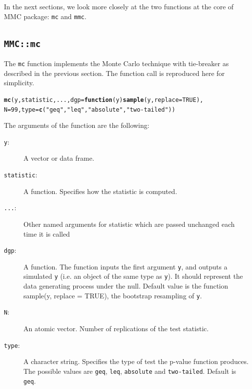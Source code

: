 \documentclass[]{article}\usepackage[]{graphicx}\usepackage[]{color}
\makeatletter
\newcommand{\hlnum}[1]{\textcolor[rgb]{0.686,0.059,0.569}{#1}}%
\newcommand{\hlstr}[1]{\textcolor[rgb]{0.192,0.494,0.8}{#1}}%
\newcommand{\hlstd}[1]{\textcolor[rgb]{0.345,0.345,0.345}{#1}}%
\newcommand{\hlkwa}[1]{\textcolor[rgb]{0.161,0.373,0.58}{\textbf{#1}}}%
\newcommand{\hlkwc}[1]{\textcolor[rgb]{0.333,0.667,0.333}{#1}}%
\newcommand{\hlkwd}[1]{\textcolor[rgb]{0.737,0.353,0.396}{\textbf{#1}}}%
\newenvironment{kframe}{%
 \def\at@end@of@kframe{}%
 \ifinner\ifhmode%
  \def\at@end@of@kframe{\end{minipage}}%
  \begin{minipage}{\columnwidth}%
 \fi\fi%
 \def\FrameCommand##1{\hskip\@totalleftmargin \hskip-\fboxsep
 \colorbox{shadecolor}{##1}\hskip-\fboxsep
     \hskip-\linewidth \hskip-\@totalleftmargin \hskip\columnwidth}%
 \MakeFramed {\advance\hsize-\width
   \@totalleftmargin\z@ \linewidth\hsize
   \@setminipage}}%
 {\par\unskip\endMakeFramed%
 \at@end@of@kframe}
\newenvironment{knitrout}{}{} %
\newcommand{\pkg}[1]{{\normalfont\fontseries{b}\selectfont #1}}
\let\code=\texttt
\makeatother
\begin{document}
In the next sections, we look more closely at the two functions at the core of \pkg{MMC} package: \code{mc} and \code{mmc}.

\subsection{\code{MMC::mc}}

The \code{mc} function implements the Monte Carlo technique with tie-breaker as described in the previous section.
The function call is reproduced here for simplicity.
\begin{knitrout}
\color{fgcolor}\begin{kframe}
\begin{alltt}
\hlkwd{mc}\hlstd{(y, statistic, ...,} \hlkwc{dgp} \hlstd{=} \hlkwa{function}\hlstd{(}\hlkwc{y}\hlstd{)} \hlkwd{sample}\hlstd{(y,} \hlkwc{replace} \hlstd{=} \hlnum{TRUE}\hlstd{),}
    \hlkwc{N} \hlstd{=} \hlnum{99}\hlstd{,} \hlkwc{type} \hlstd{=} \hlkwd{c}\hlstd{(}\hlstr{"geq"}\hlstd{,} \hlstr{"leq"}\hlstd{,} \hlstr{"absolute"}\hlstd{,} \hlstr{"two-tailed"}\hlstd{))}
\end{alltt}
\end{kframe}
\end{knitrout}

The arguments of the function are the following:
\begin{description}
	\item[\code{y}:] A vector or data frame.

	\item[\code{statistic}:] A function. Specifies how the statistic is computed.

	\item[\code{...}:] Other named arguments for statistic which are passed unchanged each time it is
		called

	\item[\code{dgp}:] A function. The function inputs the first argument \code{y}, and outputs a simulated \code{y} (i.e. an object of the same type as \code{y}). It should represent the data generating process under the null. Default value is the function sample(y, replace = TRUE), the bootstrap resampling of \code{y}.

	\item[\code{N}:] An atomic vector. Number of replications of the test statistic.

	\item[\code{type}:] A character string. Specifies the type of test the p-value function produces. The possible values are \code{geq}, \code{leq}, \code{absolute} and \code{two-tailed}. Default is \code{geq}.
\end{description}
\end{document}
